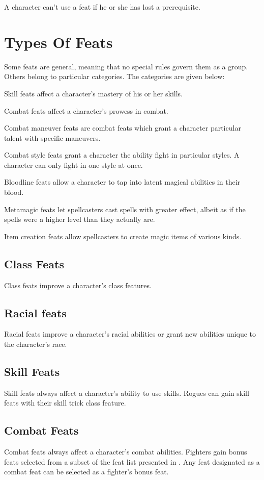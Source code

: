 A character can't use a feat if he or she has lost a prerequisite.

\section{Types Of Feats}
Some feats are general, meaning that no special rules govern
them as a group. Others belong to particular categories. The categories are given below:
\begin{itemize*}
\item Skill feats affect a character's mastery of his or her skills.
\item Combat feats affect a character's prowess in combat.
\item Combat maneuver feats are combat feats which grant a character particular talent with specific maneuvers.
\item Combat style feats grant a character the ability fight in particular styles. A character can only fight in one style at once.
\item Bloodline feats allow a character to tap into latent magical abilities in their blood.
\item Metamagic feats let spellcasters cast spells with greater effect, albeit as if the spells were a higher level than they actually are.
\item Item creation feats allow spellcasters to create magic items of various kinds.
\end{itemize*}

\subsection{Class Feats}
Class feats improve a character's class features.

\subsection{Racial feats}
Racial feats improve a character's racial abilities or grant new abilities unique to the character's race.

\subsection{Skill Feats}
Skill feats always affect a character's ability to use skills. Rogues can gain skill feats with their skill trick class feature.

\subsection{Combat Feats}
Combat feats always affect a character's combat abilities. Fighters gain bonus feats selected from a subset of the feat list presented in . Any feat designated as a combat feat can be selected as a fighter's bonus feat.

